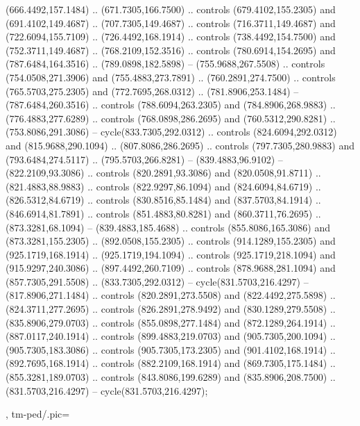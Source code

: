 {{\begin{scope}[x=0.80pt,y=-0.80pt,scale=0.038,xshift=-450pt,yshift=360pt]
        (666.4492,157.1484) .. (671.7305,166.7500) .. controls (679.4102,155.2305) and
        (691.4102,149.4687) .. (707.7305,149.4687) .. controls (716.3711,149.4687) and
        (722.6094,155.7109) .. (726.4492,168.1914) .. controls (738.4492,154.7500) and
        (752.3711,149.4687) .. (768.2109,152.3516) .. controls (780.6914,154.2695) and
        (787.6484,164.3516) .. (789.0898,182.5898) -- (755.9688,267.5508) .. controls
        (754.0508,271.3906) and (755.4883,273.7891) .. (760.2891,274.7500) .. controls
        (765.5703,275.2305) and (772.7695,268.0312) .. (781.8906,253.1484) --
        (787.6484,260.3516) .. controls (788.6094,263.2305) and (784.8906,268.9883) ..
        (776.4883,277.6289) .. controls (768.0898,286.2695) and (760.5312,290.8281) ..
        (753.8086,291.3086) -- cycle(833.7305,292.0312) .. controls
        (824.6094,292.0312) and (815.9688,290.1094) .. (807.8086,286.2695) .. controls
        (797.7305,280.9883) and (793.6484,274.5117) .. (795.5703,266.8281) --
        (839.4883,96.9102) -- (822.2109,93.3086) .. controls (820.2891,93.3086) and
        (820.0508,91.8711) .. (821.4883,88.9883) .. controls (822.9297,86.1094) and
        (824.6094,84.6719) .. (826.5312,84.6719) .. controls (830.8516,85.1484) and
        (837.5703,84.1914) .. (846.6914,81.7891) .. controls (851.4883,80.8281) and
        (860.3711,76.2695) .. (873.3281,68.1094) -- (839.4883,185.4688) .. controls
        (855.8086,165.3086) and (873.3281,155.2305) .. (892.0508,155.2305) .. controls
        (914.1289,155.2305) and (925.1719,168.1914) .. (925.1719,194.1094) .. controls
        (925.1719,218.1094) and (915.9297,240.3086) .. (897.4492,260.7109) .. controls
        (878.9688,281.1094) and (857.7305,291.5508) .. (833.7305,292.0312) --
        cycle(831.5703,216.4297) -- (817.8906,271.1484) .. controls
        (820.2891,273.5508) and (822.4492,275.5898) .. (824.3711,277.2695) .. controls
        (826.2891,278.9492) and (830.1289,279.5508) .. (835.8906,279.0703) .. controls
        (855.0898,277.1484) and (872.1289,264.1914) .. (887.0117,240.1914) .. controls
        (899.4883,219.0703) and (905.7305,200.1094) .. (905.7305,183.3086) .. controls
        (905.7305,173.2305) and (901.4102,168.1914) .. (892.7695,168.1914) .. controls
        (882.2109,168.1914) and (869.7305,175.1484) .. (855.3281,189.0703) .. controls
        (843.8086,199.6289) and (835.8906,208.7500) .. (831.5703,216.4297) --
        cycle(831.5703,216.4297);
    \end{scope}
  },
  tm-ped/.pic={
    \begin{scope}[y=-0.80pt,x=0.80pt,scale=0.038,xshift=-635pt,yshift=334pt]

\end{scope}}}
